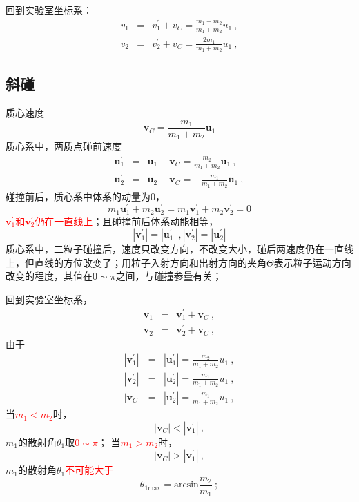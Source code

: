 \documentclass[12pt,a4paper]{article}
\renewcommand{\vec}[1]{\boldsymbol{#1}}
\begin{document}
回到实验室坐标系：
\begin{eqnarray}
v_1 &=& v_1^{\prime}  +v_C = \frac{m_1-m_2}{m_1+m_2} u_1 ~, \\
v_2 &=& v_2^{\prime}  +v_C =  \frac{2m_1}{m_1+m_2} u_1 ~, 
\end{eqnarray}

\subsection{斜碰}
质心速度
\begin{equation}
\vec{v}_C = \frac{m_1}{m_1 +m_2} \vec{u}_1
\end{equation}
质心系中，两质点碰前速度
\begin{eqnarray}
\nonumber \vec{u}_1^{\prime} &=& \vec{u}_1 -\vec{v}_C = \frac{m_2}{m_1+m_2} \vec{u}_1 ~, \\
 \vec{u}_2^{\prime} &=& \vec{u}_2 -\vec{v}_C = -\frac{m_1}{m_1+m_2} \vec{u}_1 ~,
\end{eqnarray}
碰撞前后，质心系中体系的动量为$0$，
\begin{equation}
m_1 \vec{u}_1^{\prime} + m_2 \vec{u}_2^{\prime} = m_1 \vec{v}_1^{\prime} + m_2 \vec{v}_2^{\prime} = 0
\end{equation}
\textcolor{red}{$\vec{v}_1^{\prime}$和$\vec{v}_2^{\prime}$仍在一直线上}；且碰撞前后体系动能相等，
\begin{equation}
|\vec{v}^{\prime}_1| = |\vec{u}^{\prime}_1| ~, |\vec{v}^{\prime}_2| = |\vec{u}^{\prime}_2|
\end{equation}
质心系中，二粒子碰撞后，速度只改变方向，不改变大小，碰后两速度仍在一直线上，但直线的方位改变了；用粒子入射方向和出射方向的夹角$\Theta$表示粒子运动方向改变的程度，其值在$0 \sim \pi$之间，与碰撞参量有关；

回到实验室坐标系，
\begin{eqnarray}
\nonumber \vec{v}_1 &=& \vec{v}_1^{\prime}  +\vec{v}_C  ~, \\
\vec{v}_2 &=& \vec{v}_2^{\prime}  +\vec{v}_C  ~, 
\end{eqnarray}
由于
\begin{eqnarray}
\nonumber |\vec{v}^{\prime}_1| &=& |\vec{u}^{\prime}_1| = \frac{m_2}{m_1 +m_2}u_1 ~, \\ 
\nonumber |\vec{v}^{\prime}_2| &=& |\vec{u}^{\prime}_2| = \frac{m_1}{m_1+m_2} u_1 ~, \\
 |\vec{v}_C| &=& |\vec{u}^{\prime}_2| = \frac{m_1}{m_1+m_2} u_1 ~, 
\end{eqnarray}
当\textcolor{red}{$m_1 < m_2$}时，
\begin{equation}
|\vec{v}_C| < |\vec{v}_1^{\prime}| ~,
\end{equation}
$m_1$的散射角$\theta_1$取\textcolor{red}{$0 \sim \pi$}；
当\textcolor{red}{$m_1 > m_2$}时，
\begin{equation}
|\vec{v}_C| > |\vec{v}_1^{\prime}| ~,
\end{equation}
$m_1$的散射角$\theta_1$\textcolor{red}{不可能大于}
\begin{equation}
\theta_{1 \text{max}} = \text{arcsin} \frac{m_2}{m_1} ~;
\end{equation}
\end{document}
